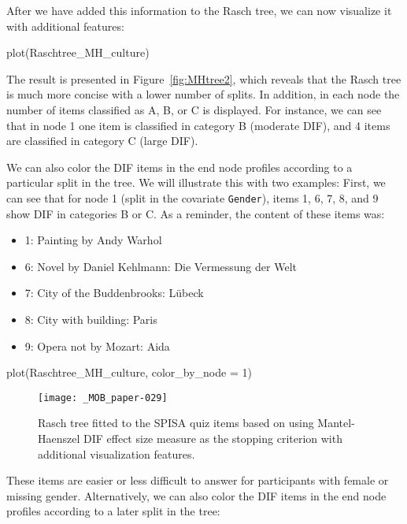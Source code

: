 \documentclass[doc,floatsintext,natbib]{apa7}
\begin{document}
After we have added this information to the Rasch tree, we can now visualize it with additional features: 

\begin{Schunk}
\begin{Sinput}
 plot(Raschtree_MH_culture)
\end{Sinput}
\end{Schunk}

The result is presented in Figure~\ref{fig:MHtree2}, which reveals that the Rasch tree is much more concise with a lower number of splits. In addition, in each node the number of items classified as A, B, or C is displayed. For instance, we can see that in node 1 one item is classified in category B (moderate DIF), and 4 items are classified in category C (large DIF).

We can also color the DIF items in the end node profiles according to a particular split in the tree. We will illustrate this with two examples: First, we can see that for node 1 (split in the covariate \texttt{Gender}), items 1, 6, 7, 8, and 9 show DIF in categories B or C. As a reminder, the content of these items was:

\begin{itemize}
\setlength\itemsep{0em}
\item 1: Painting by Andy Warhol
\item 6: Novel by Daniel Kehlmann: Die Vermessung der Welt
\item 7: City of the Buddenbrooks: Lübeck
\item 8: City with building: Paris
\item 9: Opera not by Mozart: Aida
\end{itemize}

\begin{Schunk}
\begin{Sinput}
 plot(Raschtree_MH_culture, color_by_node = 1)
\end{Sinput}
\end{Schunk}

\begin{figure}%
\caption{Rasch tree fitted to the SPISA quiz items based on using Mantel-Haenszel DIF effect size measure as the stopping criterion with additional visualization features.}
\texttt{[image: \_MOB\_paper-029]}
\label{fig:MHtree3}
\end{figure}%

These items are %
easier or less difficult to answer for participants with female or missing gender. Alternatively, we can also color the DIF items in the end node profiles according to a later split in the tree:
\end{document}
